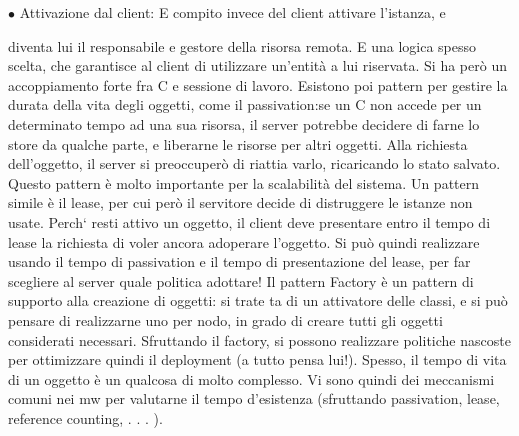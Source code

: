 $\bullet$ Attivazione dal client: E compito invece del client attivare l'istanza, e

diventa lui il responsabile e gestore della risorsa remota. E una logica
spesso scelta, che garantisce al client di utilizzare un'entità a lui riservata.
Si ha però un accoppiamento forte fra C e sessione di lavoro.
Esistono poi pattern per gestire la durata della vita degli oggetti, come il passivation:se un C non accede per un
determinato tempo ad una sua risorsa, il
server potrebbe decidere di farne lo store da qualche parte, e liberarne le risorse
per altri oggetti. Alla richiesta dell'oggetto, il server si preoccuperò di riattia
varlo, ricaricando lo stato salvato. Questo pattern è molto importante per la
scalabilità del sistema.
Un pattern simile è il lease, per cui però il servitore decide di distruggere le
istanze non usate. Perch` resti attivo un oggetto, il client deve presentare entro
il tempo di lease la richiesta di voler ancora adoperare l'oggetto. Si può quindi
realizzare usando il tempo di passivation e il tempo di presentazione del lease,
per far scegliere al server quale politica adottare!
Il pattern Factory è un pattern di supporto alla creazione di oggetti: si trate
ta di un attivatore delle classi, e si può pensare di realizzarne uno per nodo,
in grado di creare tutti gli oggetti considerati necessari. Sfruttando il factory,
si possono realizzare politiche nascoste per ottimizzare quindi il deployment (a
tutto pensa lui!).
Spesso, il tempo di vita di un oggetto è un qualcosa di molto complesso. Vi
sono quindi dei meccanismi comuni nei mw per valutarne il tempo d'esistenza
(sfruttando passivation, lease, reference counting, . . . ).
